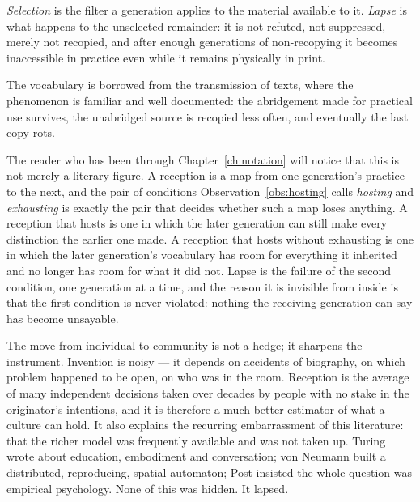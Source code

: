 \begin{principle}
\label{psy:prin:lapse}
\emph{Selection} is the filter a generation applies to the material
available to it.
\emph{Lapse} is what happens to the unselected remainder: it is not
refuted, not suppressed, merely not recopied, and after enough
generations of non-recopying it becomes inaccessible in practice
even while it remains physically in print.
\end{principle}

The vocabulary is borrowed from the transmission of texts, where the
phenomenon is familiar and well documented: the abridgement made for
practical use survives, the unabridged source is recopied less
often, and eventually the last copy rots.

\begin{remark}
\label{psy:rem:lapse-hosting}
The reader who has been through Chapter~\ref{ch:notation} will
notice that this is not merely a literary figure.
A reception is a map from one generation's practice to the next,
and the pair of conditions Observation~\ref{obs:hosting} calls
\emph{hosting} and \emph{exhausting} is exactly the pair that
decides whether such a map loses anything.
A reception that hosts is one in which the later generation can
still make every distinction the earlier one made.
A reception that hosts without exhausting is one in which the later
generation's vocabulary has room for everything it inherited and no
longer has room for what it did not.
Lapse is the failure of the second condition, one generation at a
time, and the reason it is invisible from inside is that the first
condition is never violated: nothing the receiving generation can
say has become unsayable.
\end{remark}

The move from individual to community is not a hedge; it sharpens
the instrument.
Invention is noisy --- it depends on accidents of biography, on
which problem happened to be open, on who was in the room.
Reception is the average of many independent decisions taken over
decades by people with no stake in the originator's intentions, and
it is therefore a much better estimator of what a culture can hold.
It also explains the recurring embarrassment of this literature:
that the richer model was frequently available and was not taken up.
Turing wrote about education, embodiment and conversation; von
Neumann built a distributed, reproducing, spatial automaton; Post
insisted the whole question was empirical psychology.
None of this was hidden.
It lapsed.

